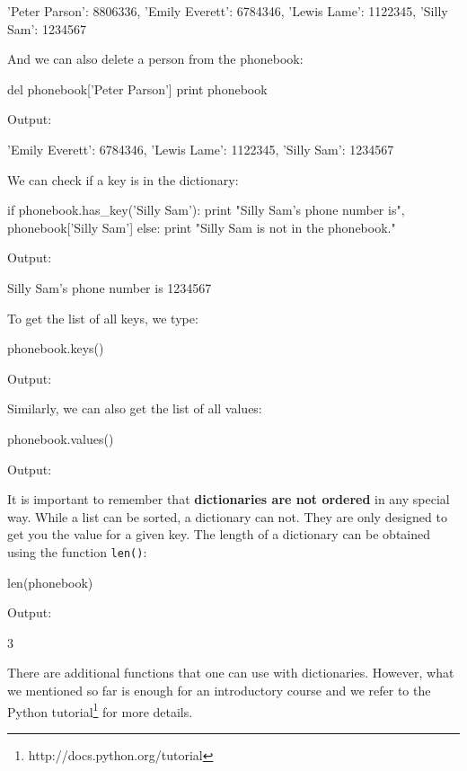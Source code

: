 \begin{greencode}
{'Peter Parson': 8806336, 'Emily Everett': 6784346,
'Lewis Lame': 1122345, 'Silly Sam': 1234567}
\end{greencode}
And we can also delete a person from the phonebook:

\begin{bluecode}
del phonebook['Peter Parson']
print phonebook
\end{bluecode}
Output:

\begin{greencode}
{'Emily Everett': 6784346, 'Lewis Lame': 1122345, 
'Silly Sam': 1234567}
\end{greencode}
We can check if a key is in the dictionary:

\begin{bluecode}
if phonebook.has_key('Silly Sam'):
    print "Silly Sam's phone number is", phonebook['Silly Sam']
else:
    print "Silly Sam is not in the phonebook."
\end{bluecode}
Output:

\begin{greencode}
Silly Sam's phone number is 1234567
\end{greencode}
To get the list of all keys, we type:

\begin{bluecode}
phonebook.keys()
\end{bluecode}
Output:

\begin{greencode}
\end{greencode}
Similarly, we can also get the list of all values:

\begin{bluecode}
phonebook.values()
\end{bluecode}
Output:

\begin{greencode}
[6784346, 1122345, 1234567]
\end{greencode}
It is important to remember that {\bf dictionaries are not ordered} in any 
special way. While a list can be sorted, a dictionary can not. They are only 
designed to get you the value for a given key. 
The length of a dictionary can be obtained using the function {\tt len()}:

\begin{bluecode}
len(phonebook)
\end{bluecode}
Output:

\begin{greencode}
3
\end{greencode}
There are additional functions that one can use with dictionaries. However, 
what we mentioned so far is enough for an introductory course and we refer 
to the Python tutorial\footnote{http://docs.python.org/tutorial} for more 
details.

